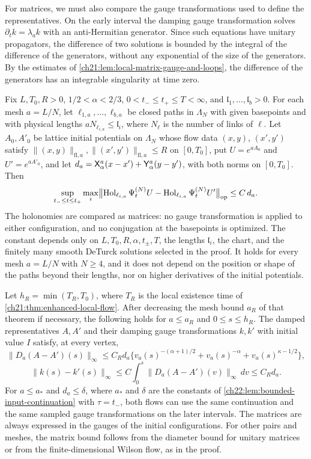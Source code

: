 For matrices, we must also compare the gauge transformations used to define the representatives. On the early interval the damping gauge transformation solves $\partial_tk=\lambda_ak$ with an anti-Hermitian generator. Since such equations have unitary propagators, the difference of two solutions is bounded by the integral of the difference of the generators, without any exponential of the size of the generators. By the estimates of \cref{ch21:lem:local-matrix-gauge-and-loops}, the difference of the generators has an integrable singularity at time zero.

\begin{theorem}\label{ch22:thm:root-matrix-modulus}
Fix $L,T_0,R>0$, $1/2<\alpha<2/3$, $0<t_-\le t_+\le T<\infty$, and $\mathfrak l_1,\ldots,\mathfrak l_b>0$. For each mesh $a=L/N$, let $\ell_{1,a},\ldots,\ell_{b,a}$ be closed paths in $\Lambda_N$ with given basepoints and with physical lengths $aN_{\ell_{i,a}}\le\mathfrak l_i$, where $N_\ell$ is the number of links of $\ell$. Let $A_0,A'_0$ be lattice initial potentials on $\Lambda_N$ whose flow data $(x,y)$, $(x',y')$ satisfy $\|(x,y)\|_{\mathrm{fl},a},\|(x',y')\|_{\mathrm{fl},a}\le R$ on $[0,T_0]$, put $U=e^{aA_0}$ and $U'=e^{aA'_0}$, and let $d_a=\mathsf X_{\alpha}^{a}(x-x')+\mathsf Y_{\alpha}^{a}(y-y')$, with both norms on $[0,T_0]$. Then
\[
 \sup_{t_-\le t\le t_+}\max_i\bigl\|\operatorname{Hol}_{\ell_{i,a}}\Psi_t^{(N)}U-\operatorname{Hol}_{\ell_{i,a}}\Psi_t^{(N)}U'\bigr\|_{\rm op}\le C\,d_a .
\]
The holonomies are compared as matrices: no gauge transformation is applied to either configuration, and no conjugation at the basepoints is optimized. The constant depends only on $L,T_0,R,\alpha,t_\pm,T$, the lengths $\mathfrak l_i$, the chart, and the finitely many smooth DeTurck solutions selected in the proof. It holds for every mesh $a=L/N$ with $N\ge4$, and it does not depend on the position or shape of the paths beyond their lengths, nor on higher derivatives of the initial potentials.

Let $h_R=\min(T_R,T_0)$, where $T_R$ is the local existence time of \cref{ch21:thm:enhanced-local-flow}. After decreasing the mesh bound $a_R$ of that theorem if necessary, the following holds for $a\le a_R$ and $0\le s\le h_R$. The damped representatives $A,A'$ and their damping gauge transformations $k,k'$ with initial value $I$ satisfy, at every vertex,
\[
 \|D_a(A-A')(s)\|_\infty\le C_Rd_a\bigl\{v_a(s)^{-(\alpha+1)/2}+v_a(s)^{-\alpha}+v_a(s)^{\kappa-1/2}\bigr\},
\]
\[
 \|k(s)-k'(s)\|_\infty\le C\int_0^s\|D_a(A-A')(v)\|_\infty\,dv\le C_Rd_a .
\]
For $a\le a_*$ and $d_a\le\delta$, where $a_*$ and $\delta$ are the constants of \cref{ch22:lem:bounded-input-continuation} with $\tau=t_-$, both flows can use the same continuation and the same sampled gauge transformations on the later intervals. The matrices are always expressed in the gauges of the initial configurations. For other pairs and meshes, the matrix bound follows from the diameter bound for unitary matrices or from the finite-dimensional Wilson flow, as in the proof.
\end{theorem}

